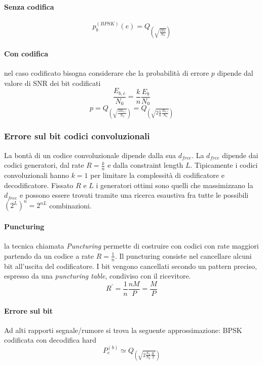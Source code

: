             \paragraph{Senza codifica}
                \[
                    p_b^{(BPSK)}(e) = Q_{\displaystyle\left(\sqrt{\frac{2E_b}{N_0}}\right)}  
                \]
            \paragraph{Con codifica}
                nel caso codificato bisogna considerare che la probabilità di errore $p$ dipende dal valore di SNR dei bit codificati
                \[
                    \frac{E_{b,c}}{N_0} = \frac{k}{n} \frac{E_b}{N_0}    
                \]
                \[
                    p = Q_{\displaystyle\left(\sqrt{\frac{2E_{b,c}}{N_0}}\right)} = Q_{\displaystyle\left(\sqrt{2\frac{k}{n}\frac{E_{b,c}}{N_0}}\right)} 
                \]
        \subsubsection{Errore sul bit codici convoluzionali}
            La bontà di un codice convoluzionale dipende dalla sua $d_{free}$. La $d_{free}$ dipende
            dai codici generatori, dal rate $R= \frac{k}{n}$ e dalla constraint length $L$. Tipicamente i 
            codici convoluzionali hanno $k=1$ per limitare la complessità di codificatore e decodificatore. 
            Fissato $R$ e $L$ i generatori ottimi sono quelli che massimizzano la $d_{free}$ e possono essere trovati 
            tramite una ricerca esaustiva fra tutte le possibili $\left(2^L\right)^n = 2^{nL}$ combinazioni.
            \paragraph{Puncturing}
                la tecnica chiamata \emph{Puncturing} permette di costruire con codici con rate maggiori partendo da un codice
                a rate $R=\frac{1}{n}$. Il puncturing consiste nel cancellare alcuni bit all'uscita del codificatore.
                I bit vengono cancellati secondo un pattern preciso, espresso da una \emph{puncturing table}, condiviso
                con il ricevitore.
                \[
                    R^\prime = \frac{1}{n} \frac{nM}{P}=\frac{M}{P}  
                \]
            \paragraph{Errore sul bit}
                Ad alti rapporti segnale/rumore si trova la seguente approssimazione: BPSK codificata con 
                decodifica hard
                \[
                    P_e^{(b)} \simeq Q_{\displaystyle \left(\sqrt{2\frac{E_b}{N_0}\frac{R^\prime}{2}}\right)}  
                \] 
